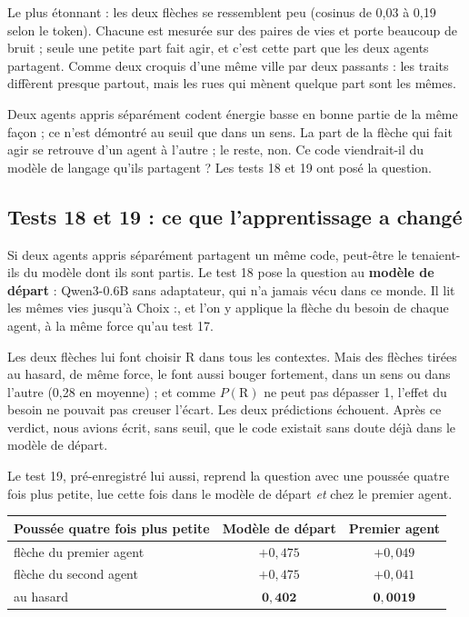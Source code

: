 \documentclass[fontsize=10pt,paper=a4,parskip=half-]{scrartcl}
\newcommand{\q}[1]{\og #1\fg{}}
\begin{document}
Le plus étonnant : les deux flèches se ressemblent peu (cosinus de 0,03 à 0,19 selon le
token). Chacune est mesurée sur des paires de vies et porte beaucoup de bruit ; seule une
petite part fait agir, et c'est cette part que les deux agents partagent. Comme deux
croquis d'une même ville par deux passants : les traits diffèrent presque partout, mais
les rues qui mènent quelque part sont les mêmes.

\begin{essentiel}
Deux agents appris séparément codent \q{énergie basse} en bonne partie de la même façon ;
ce n'est démontré au seuil que dans un sens. La part de la flèche qui fait agir se retrouve
d'un agent à l'autre ; le reste, non. Ce code viendrait-il du modèle de langage qu'ils
partagent ? Les tests 18 et 19 ont posé la question.
\end{essentiel}

\subsection{Tests 18 et 19 : ce que l'apprentissage a changé}
Si deux agents appris séparément partagent un même code, peut-être le tenaient-ils du modèle
dont ils sont partis. Le test 18 pose la question au \textbf{modèle de départ} : Qwen3-0.6B
sans adaptateur, qui n'a jamais vécu dans ce monde. Il lit les mêmes vies jusqu'à \q{Choix :},
et l'on y applique la flèche du besoin de chaque agent, à la même force qu'au test 17.

Les deux flèches lui font choisir R dans tous les contextes. Mais des flèches tirées au hasard,
de même force, le font aussi bouger fortement, dans un sens ou dans l'autre (0,28 en moyenne) ;
et comme $P(\text{R})$ ne peut pas dépasser 1, l'effet du besoin ne pouvait pas creuser l'écart.
Les deux prédictions échouent. Après ce verdict, nous avions écrit, sans seuil, que le code
existait sans doute déjà dans le modèle de départ.

Le test 19, pré-enregistré lui aussi, reprend la question avec une poussée quatre fois plus
petite, lue cette fois dans le modèle de départ \emph{et} chez le premier agent.

\begin{center}\small
\begin{tabular}{lcc}
\toprule
\textsf{Poussée quatre fois plus petite} & \textsf{Modèle de départ} & \textsf{Premier agent}\\
\midrule
flèche du premier agent & $+0,475$ & $+0,049$\\
flèche du second agent & $+0,475$ & $+0,041$\\
au hasard & $\mathbf{0,402}$ & $\mathbf{0,0019}$\\
\bottomrule
\end{tabular}
\end{center}
\end{document}

